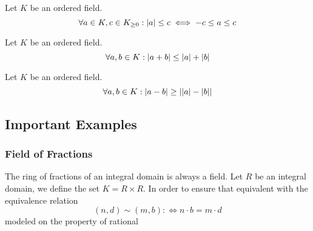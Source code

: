\begin{proposition}
   Let \(K\) be an ordered field.
   \[\forall a \in K, c \in K_{\geq 0}: \left\lvert a\right\rvert \leq c \iff -c \leq a \leq c\]
\end{proposition}

\begin{proposition}
   Let \(K\) be an ordered field.
   \[\forall a,b \in K: \left\lvert a + b\right\rvert \leq \left\lvert a\right\rvert + \left\lvert b\right\rvert\]
\end{proposition}

\begin{proposition}
   Let \(K\) be an ordered field.
   \[\forall a,b \in K: \left\lvert a - b\right\rvert \geq \left\lvert\left\lvert a\right\rvert- \left\lvert b\right\rvert\right\rvert\]
\end{proposition}

\subsection{Important Examples}
\subsubsection{Field of Fractions}
The ring of fractions of an integral domain is always a field.
Let \(R\) be an integral domain, we define the set \(K = R \times R\).
In order to ensure that equivalent
with the equivalence relation
\[(n, d) \sim (m, b) :\iff n \cdot b = m \cdot d\]
modeled on the property of rational


